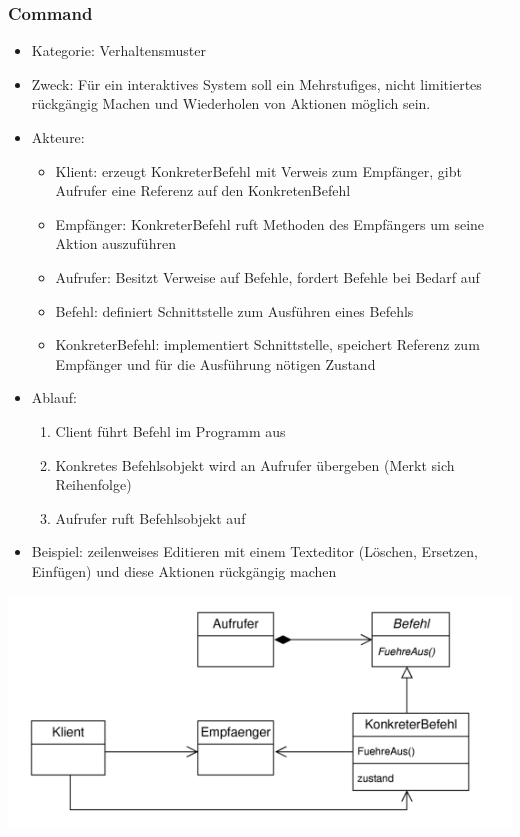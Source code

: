 \documentclass[11pt, fleqn, a4paper, leqno]{scrartcl} %
\begin{document}
		\subsubsection{Command}
			\begin{itemize}
				\item Kategorie: Verhaltensmuster
				\item Zweck: Für ein interaktives System soll ein Mehrstufiges, nicht limitiertes rückgängig Machen und Wiederholen von Aktionen möglich sein.
				\item Akteure: 
					\begin{itemize}
						\item Klient: erzeugt KonkreterBefehl mit Verweis zum Empfänger, gibt Aufrufer eine Referenz auf den KonkretenBefehl
						\item Empfänger: KonkreterBefehl ruft Methoden des Empfängers um seine Aktion auszuführen
						\item Aufrufer: Besitzt Verweise auf Befehle, fordert Befehle  bei Bedarf auf
						\item Befehl: definiert Schnittstelle zum Ausführen eines Befehls
						\item KonkreterBefehl: implementiert Schnittstelle, speichert Referenz zum Empfänger und für die Ausführung nötigen Zustand
					\end{itemize}
				\item Ablauf:
					\begin{enumerate}
						\item Client führt Befehl im Programm aus
						\item Konkretes Befehlsobjekt wird an Aufrufer übergeben (Merkt sich Reihenfolge)
						\item Aufrufer ruft Befehlsobjekt auf
					\end{enumerate}
				\item Beispiel: zeilenweises Editieren mit einem Texteditor (Löschen, Ersetzen, Einfügen) und diese Aktionen rückgängig machen
			\end{itemize}
			\includegraphics[scale=0.8]{images/commando.png}
			\newpage
\end{document}
